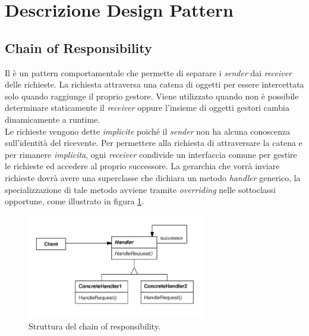 \pagebreak
\section{Descrizione Design Pattern}
\label{appendice-pattern}

	\subsection{Chain of Responsibility} %
	Il  è un pattern comportamentale che permette di separare i \emph{sender} dai \emph{receiver} delle richieste. La richiesta attraversa una catena di oggetti per essere intercettata solo quando raggiunge il proprio gestore. Viene utilizzato quando non è possibile determinare staticamente il \emph{receiver} oppure l'insieme di oggetti gestori cambia dinamicamente a runtime. \\ Le richieste vengono dette \emph{implicite} poiché il \emph{sender} non ha alcuna conoscenza sull'identità del ricevente. Per permettere alla richiesta di attraversare la catena e per rimanere \emph{implicita}, ogni \emph{receiver} condivide un interfaccia comune per gestire le richieste ed accedere al proprio successore. 
	La gerarchia che vorrà inviare richieste dovrà avere una superclasse che dichiara un metodo \emph{handler} generico, la specializzazione di tale metodo avviene tramite \emph{overriding} nelle sottoclassi opportune, come illustrato in figura \ref{fig:chainofresponsibility}.
	
	\begin{figure}[h]
	\centering \includegraphics[width=0.7\textwidth]{patterns/ChainOfResponsability.png}
	\caption{Struttura del chain of responsibility.}
	\label{fig:chainofresponsibility}
	\end{figure}
	
